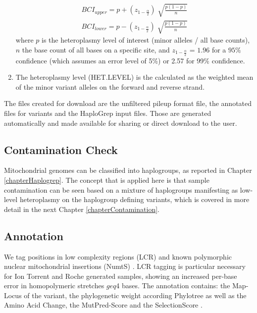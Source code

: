 \begin{enumerate}
\begin{equation}
\begin{split}
  BCI_{upper} = p + \left(z_{1- \frac{\alpha}{2}} \right)\sqrt[]{\frac{p (1-p)}{n} } \\ 
  BCI_{lower} = p - \left(z_{1- \frac{\alpha}{2}} \right)\sqrt[]{\frac{p (1-p)}{n} } 
\end{split}
\end{equation}
where $p$ is the heteroplasmy level of interest (minor alleles / all base counts), $n$ the base count of all bases on a specific site, and  $z_{1- \frac{\alpha}{2}}$ = $1.96$ for a $95\%$ confidence (which assumes an error level of 5\%) or 2.57 for 99\% confidence.
\item The heteroplasmy level (HET.LEVEL) is the calculated as the weighted mean of the minor variant alleles on the forward and reverse strand. 
\end{enumerate}
The files created for download are the unfiltered pileup format file, the annotated files for variants and the HaploGrep input files. Those are generated automatically and made available for sharing or direct download to the user.
\subsection{Contamination Check}
Mitochondrial genomes can be classified into haplogroups, as reported in Chapter \ref{chapterHaplogrep}. The concept that is applied here is that sample contamination can be seen based on a mixture of haplogroups manifesting as low-level heteroplasmy on the haplogroup defining variants, which is covered in more detail in the next Chapter \ref{chapterContamination}. 
\subsection{Annotation}\label{subs:annotation}
We tag positions in low complexity regions (LCR) \cite{Zhidkov2011} and known polymorphic nuclear mitochondrial insertions (NumtS) \cite{Dayama2014}. LCR tagging is particular necessary for Ion Torrent and Roche generated samples, showing an increased per-base error in homopolymeric stretches $geq$4 bases.  The annotation contains: the Map-Locus of the variant, the phylogenetic weight according Phylotree \cite{VanOven2009} as well as the Amino Acid Change, the MutPred-Score \cite{Li-mutpred2009} and the SelectionScore \cite{Pereira2011}.
